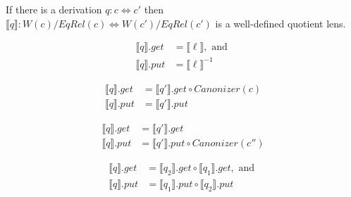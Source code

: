 \documentclass{svproc}
\newcommand{\canonizer}{\ensuremath{\mathit{Canonizer}}}
\begin{document}
\begin{theorem}
If there is a derivation $q:c \Leftrightarrow c'$ then
$\llbracket q \rrbracket : W(c)/EqRel(c) \Leftrightarrow W(c')/EqRel(c')$ is a
well-defined quotient lens.
\end{theorem}

 \begin{figure}[t]
  \centering
  \begin{prooftree}
\end{prooftree}
  \begin{align*}
  \llbracket q \rrbracket.get &=  \llbracket \ell \rrbracket, \text{ and }\\
  \llbracket q \rrbracket.put &= \llbracket \ell \rrbracket^{-1}
  \end{align*}
 
\begin{prooftree}
\end{prooftree}
  \begin{align*}
  \llbracket q \rrbracket.get  &= \llbracket q'
  \rrbracket.get \circ \canonizer(c)\\
  \llbracket q \rrbracket.put &= \llbracket q' \rrbracket.put
  \end{align*}

  \begin{prooftree}
  
\end{prooftree}
  \begin{align*}
  \llbracket q \rrbracket.get &= \llbracket q'
  \rrbracket.get\\
  \llbracket q \rrbracket.put &= \llbracket q'
  \rrbracket.put \circ \canonizer(c'')
  \end{align*}
  
  \begin{prooftree}
\end{prooftree}
  \begin{align*}
  \llbracket q \rrbracket.get &= \llbracket q_2 \rrbracket.get\circ \llbracket
  q_1 \rrbracket.get, \text{ and }\\
  \llbracket q \rrbracket.put &= \llbracket q_1 \rrbracket.put \circ \llbracket
  q_2 \rrbracket.put
  \end{align*}


\end{figure}
\end{document}
